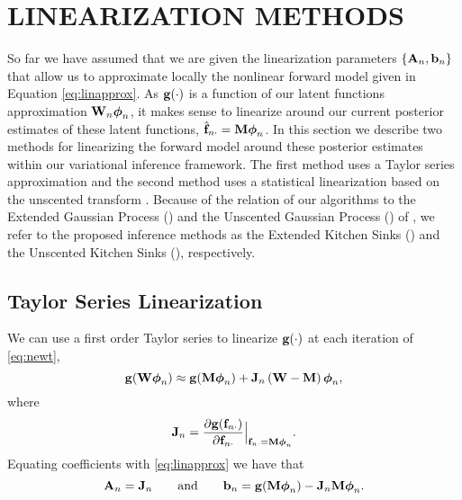 \section{LINEARIZATION METHODS}
So far we have assumed that we are given the linearization parameters $\{\mathbf{A}_n, \mathbf{b}_n\}$ that allow us to 
approximate locally the nonlinear forward model given in Equation   \eqref{eq:linapprox}. As 
$\mathbf{g}\!\left({{\cdot}}\right)$  is a function of our latent functions approximation ${\mathbf{W}_n\boldsymbol\phi_n}$,  
it makes sense to linearize around our current posterior estimates of these latent functions, 
$\hat{\mathbf{f}}_{n \cdot} =\mathbf{M} \boldsymbol\phi_n$. In this section we describe two methods for linearizing 
the  forward model around these posterior estimates within our variational 
inference framework. The first method uses a Taylor series approximation and the second 
method uses a statistical linearization \citep{Geist2010} based on the unscented transform \citep{Julier2004}. 
Because of the relation of our algorithms to the Extended Gaussian Process (\egp) and 
the  Unscented Gaussian Process (\ugp) of \citet{steinberg-bonilla-nips-2014},   we refer to 
the proposed inference methods as  the Extended Kitchen Sinks (\eks) and the 
Unscented Kitchen Sinks (\uks), respectively.
%
\subsection{Taylor Series Linearization}
We can use a first order Taylor series to linearize $\mathbf{g}\!\left({{\cdot}}\right)$ at each
iteration of \eqref{eq:newt},
\begin{equation}
    \mathbf{g}\!\left({{\mathbf{W}\boldsymbol\phi_n}}\right) \approx \mathbf{g}\!\left({{\mathbf{M}\boldsymbol\phi_n}}\right) +
    \mathbf{J}_{n}\left({\mathbf{W} - \mathbf{M}}\right)\boldsymbol\phi_n,
\end{equation}
where 
\begin{equation}
\mathbf{J}_{n} = \frac{ \partial\mathbf{g}\!\left({{\mathbf{f}_{n \cdot}}}\right) } {  \partial \mathbf{f}_{n \cdot} }  \Big|_{\mathbf{f}_{n \cdot} = \mathbf{M} \boldsymbol\phi_n } \text{.}
\end{equation}
Equating coefficients with \eqref{eq:linapprox} we have that
\begin{equation}
    \mathbf{A}_n = \mathbf{J}_{n} \qquad \text{and} \qquad \mathbf{b}_n = 
        \mathbf{g}\!\left({{\mathbf{M}\boldsymbol\phi_n}}\right) - \mathbf{J}_{n}\mathbf{M}\boldsymbol\phi_n.
\end{equation}
%
